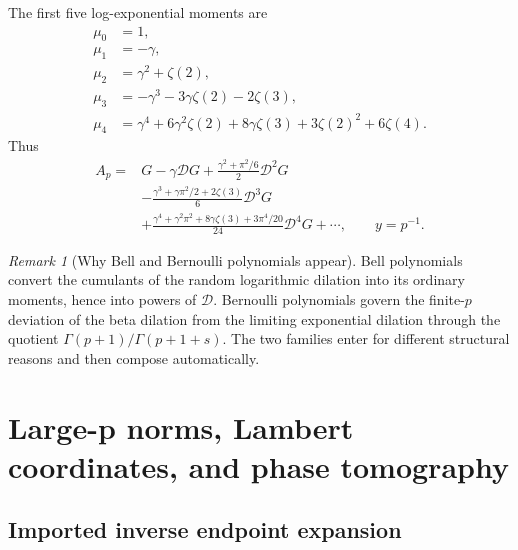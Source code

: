 \documentclass[11pt,oneside]{article}
\numberwithin{equation}{section}
\theoremstyle{plain}
\theoremstyle{definition}
\theoremstyle{remark}
\newtheorem{remark}[theorem]{Remark}
\newcommand{\Dop}{\mathscr D}
\begin{document}
The first five log-exponential moments are
\begin{align}
 \mu_0&=1,\nonumber\\
 \mu_1&=-\gamma,\nonumber\\
 \mu_2&=\gamma^2+\zeta(2),\nonumber\\
 \mu_3&=-\gamma^3-3\gamma\zeta(2)-2\zeta(3),\nonumber\\
 \mu_4&=\gamma^4+6\gamma^2\zeta(2)+8\gamma\zeta(3)
       +3\zeta(2)^2+6\zeta(4).
 \label{eq:first-mu}
\end{align}
Thus
\begin{align}
 A_p={}&G-\gamma\Dop G
 +\frac{\gamma^2+\pi^2/6}{2}\Dop^2G\nonumber\\
 &-\frac{\gamma^3+\gamma\pi^2/2+2\zeta(3)}{6}\Dop^3G\nonumber\\
 &+\frac{\gamma^4+\gamma^2\pi^2+8\gamma\zeta(3)+3\pi^4/20}{24}\Dop^4G
 +\cdots,
 \qquad y=p^{-1}.
 \label{eq:Gamma-operator-first-terms}
\end{align}

\begin{remark}[Why Bell and Bernoulli polynomials appear]
Bell polynomials convert the cumulants of the random logarithmic dilation into its ordinary
moments, hence into powers of $\Dop$.  Bernoulli polynomials govern the finite-$p$ deviation
of the beta dilation from the limiting exponential dilation through the quotient
$\Gamma(p+1)/\Gamma(p+1+s)$.  The two families enter for different structural reasons and
then compose automatically.
\end{remark}

\section{Large-p norms, Lambert coordinates, and phase tomography}
\label{sec:large-p}

\subsection{Imported inverse endpoint expansion}
\end{document}
